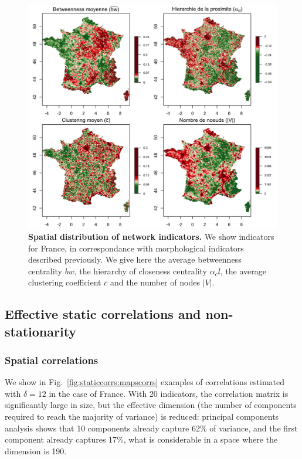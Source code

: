 \begin{figure}
\includegraphics[width=\linewidth]{figures/4-1-2-fig-staticcorrs-network}
\caption{\textbf{Spatial distribution of network indicators.} We show indicators for France, in correspondance with morphological indicators described previously. We give here the average betweenness centrality $\bar{bw}$, the hierarchy of closeness centrality $\alpha_cl$, the average clustering coefficient $\bar{c}$ and the number of nodes $\left|V\right|$.\label{fig:staticcorrs:network}}
\end{figure}


\subsection{Effective static correlations and non-stationarity}


\subsubsection{Spatial correlations}


We show in Fig.~\ref{fig:staticcorrs:mapscorrs} examples of correlations estimated with $\delta = 12$ in the case of France. With 20 indicators, the correlation matrix is significantly large in size, but the effective dimension (the number of components required to reach the majority of variance) is reduced:  principal components analysis shows that 10 components already capture 62\% of variance, and the first component already captures 17\%, what is considerable in a space where the dimension is 190.

